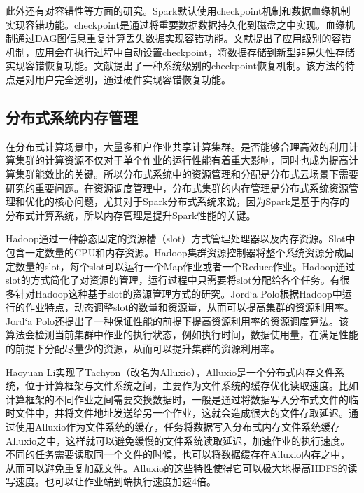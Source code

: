 此外还有对容错性等方面的研究。Spark默认使用checkpoint机制和数据血缘机制实现容错功能。checkpoint是通过将重要数据数据持久化到磁盘之中实现\cite{ananthanarayanan2012pacman}。血缘机制通过DAG图信息重复计算丢失数据实现容错功能\cite{zaharia2010spark}。文献\cite{zaharia2012resilient}提出了应用级别的容错机制，应用会在执行过程中自动设置checkpoint，将数据存储到新型非易失性存储实现容错恢复功能。文献\cite{dimitriou2015retrial}提出了一种系统级别的checkpoint恢复机制。该方法的特点是对用户完全透明，通过硬件实现容错恢复功能。

\subsection{分布式系统内存管理}

在分布式计算场景中，大量多租户作业共享计算集群。是否能够合理高效的利用计算集群的计算资源不仅对于单个作业的运行性能有着重大影响，同时也成为提高计算集群能效比的关键。所以分布式系统中的资源管理和分配是分布式云场景下需要研究的重要问题。在资源调度管理中，分布式集群的内存管理是分布式系统资源管理和优化的核心问题，尤其对于Spark分布式系统来说，因为Spark是基于内存的分布式计算系统，所以内存管理是提升Spark性能的关键。

Hadoop通过一种静态固定的资源槽（slot）方式管理处理器以及内存资源。Slot中包含一定数量的CPU和内存资源。Hadoop集群资源控制器将整个系统资源分成固定数量的slot，每个slot可以运行一个Map作业或者一个Reduce作业。Hadoop通过slot的方式简化了对资源的管理，运行过程中只需要将slot分配给各个任务。有很多针对Hadoop这种基于slot的资源管理方式的研究。Jord`a Polo\cite{0Leveraging}根据Hadoop中运行的作业特点，动态调整slot的数量和资源量，从而可以提高集群的资源利用率。Jord`a Polo还提出了一种保证性能的前提下提高资源利用率的资源调度算法。该算法会检测当前集群中作业的执行状态，例如执行时间，数据使用量，在满足性能的前提下分配尽量少的资源，从而可以提升集群的资源利用率。

Haoyuan Li实现了Tachyon\cite{li2014tachyon}（改名为Alluxio\cite{li2018alluxio}），Alluxio是一个分布式内存文件系统，位于计算框架与文件系统之间，主要作为文件系统的缓存优化读取速度。比如计算框架的不同作业之间需要交换数据时，一般是通过将数据写入分布式文件的临时文件中，并将文件地址发送给另一个作业，这就会造成很大的文件存取延迟。通过使用Alluxio作为文件系统的缓存，任务将数据写入分布式内存文件系统缓存Alluxio之中，这样就可以避免缓慢的文件系统读取延迟，加速作业的执行速度。不同的任务需要读取同一个文件的时候，也可以将数据缓存在Alluxio内存之中，从而可以避免重复加载文件。Alluxio的这些特性使得它可以极大地提高HDFS的读写速度。也可以让作业端到端执行速度加速4倍。

